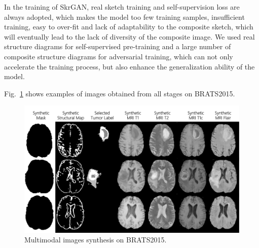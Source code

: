 \documentclass[runningheads]{llncs}
\begin{document}
In the training of SkrGAN\cite{96zhang2019skrgan:}, real sketch training and self-supervision loss are always adopted, which makes the model too few training samples, insufficient training, easy to over-fit and lack of adaptability to the composite sketch, which will eventually lead to the lack of diversity of the composite image. We used real structure diagrams for self-supervised pre-training and a large number of composite structure diagrams for adversarial training, which can not only accelerate the training process, but also enhance the generalization ability of the model.

Fig.~\ref{generated_mri} shows examples of images obtained from all stages on BRATS2015.
\begin{figure}
	\centering
	\includegraphics[width=0.7\linewidth]{figures/F_to_MRI}
	\caption{Multimodal images synthesis on BRATS2015.}
	\label{generated_mri}
\end{figure}
\end{document}
